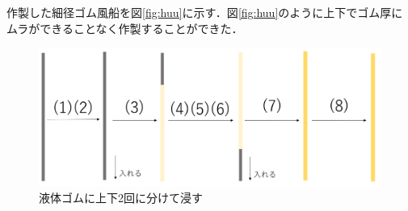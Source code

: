 作製した細径ゴム風船を図\ref{fig:huu}に示す．図\ref{fig:huu}のように上下でゴム厚にムラができることなく作製することができた．
\begin{figure}[!h]
  \centering  %
  \includegraphics[scale=0.35]{pic/tezyun2.PNG}
  \caption{液体ゴムに上下2回に分けて浸す}
  \label{fig:2kai}
\end{figure}
